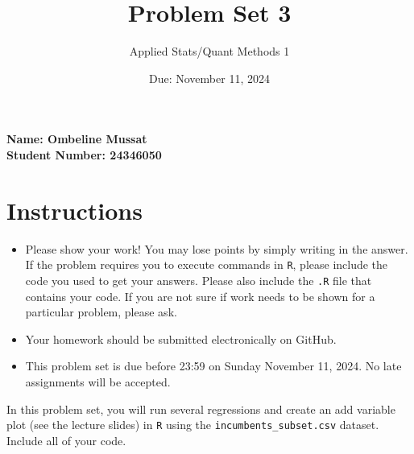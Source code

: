 \documentclass[12pt,letterpaper]{article}
\title{Problem Set 3}
\date{Due: November 11, 2024}
\author{Applied Stats/Quant Methods 1}
\begin{document}
	\maketitle
	\vspace{-2em} 
	\noindent \textbf{Name: Ombeline Mussat} \\
	\noindent \textbf{Student Number: 24346050} \\
	\vspace{1cm}
	
	\section*{Instructions}
	\begin{itemize}
		\item Please show your work! You may lose points by simply writing in the answer. If the problem requires you to execute commands in \texttt{R}, please include the code you used to get your answers. Please also include the \texttt{.R} file that contains your code. If you are not sure if work needs to be shown for a particular problem, please ask.
	\item Your homework should be submitted electronically on GitHub.
	\item This problem set is due before 23:59 on Sunday November 11, 2024. No late assignments will be accepted.

	\end{itemize}

		\vspace{.25cm}
	
\noindent In this problem set, you will run several regressions and create an add variable plot (see the lecture slides) in \texttt{R} using the \texttt{incumbents\_subset.csv} dataset. Include all of your code.

\newpage
\end{document}
